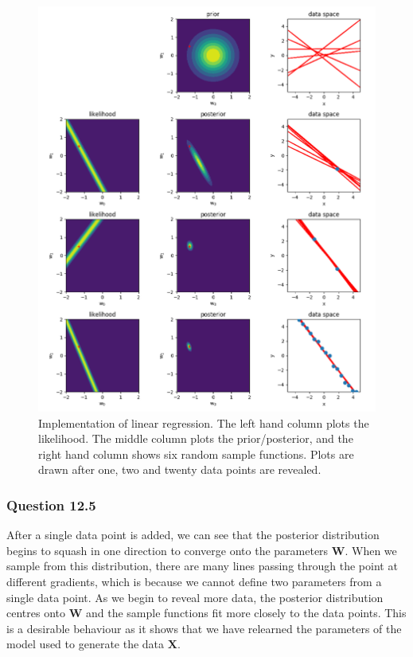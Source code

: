 \documentclass[10pt, a4paper, twocolumn]{article} %
\begin{document}
\begin{figure}[!htb]
\centerline{\includegraphics[width=\linewidth]{q12.png}}
\caption{Implementation of linear regression. The left hand column plots the likelihood. The middle column plots the prior/posterior, and the right hand column shows six random sample functions. Plots are drawn after one, two and twenty data points are revealed.}
\label{fig2}
\end{figure}

\subsubsection*{Question 12.5}
After a single data point is added, we can see that the posterior distribution begins to squash in one direction to converge onto the parameters $\mathbf{W}$. When we sample from this distribution, there are many lines passing through the point at different gradients, which is because we cannot define two parameters from a single data point. As we begin to reveal more data, the posterior distribution centres onto $\mathbf{W}$ and the sample functions fit more closely to the data points. This is a desirable behaviour as it shows that we have relearned the parameters of the model used to generate the data $\mathbf{X}$.
\end{document}
